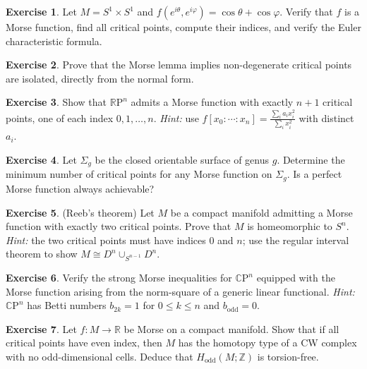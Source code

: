 \documentclass[12pt,a4paper,openany]{book}
\theoremstyle{definition}
\newtheorem{exercise}{Exercise}[chapter]
\theoremstyle{remark}
\newcommand{\Z}{\mathbb{Z}}
\newcommand{\R}{\mathbb{R}}
\newcommand{\RP}{\mathbb{R}\mathrm{P}}
\newcommand{\CP}{\mathbb{C}\mathrm{P}}
\begin{document}
\begin{exercise}\label{exo:morse-3}
Let $M = S^1 \times S^1$ and $f(e^{i\theta},e^{i\varphi}) = \cos\theta + \cos\varphi$.
Verify that $f$ is a Morse function, find all critical points, compute
their indices, and verify the Euler characteristic formula.
\end{exercise}

\begin{exercise}\label{exo:morse-4}
Prove that the Morse lemma implies non-degenerate critical points are
isolated, directly from the normal form.
\end{exercise}

\begin{exercise}\label{exo:morse-5}
Show that $\RP^n$ admits a Morse function with exactly $n+1$ critical
points, one of each index $0,1,\dots,n$.
\emph{Hint:} use $f[x_0:\cdots:x_n] = \frac{\sum_i a_i x_i^2}{\sum_i x_i^2}$
with distinct $a_i$.
\end{exercise}

\begin{exercise}\label{exo:morse-6}
Let $\Sigma_g$ be the closed orientable surface of genus $g$.
Determine the minimum number of critical points for any Morse function
on $\Sigma_g$. Is a perfect Morse function always achievable?
\end{exercise}

\begin{exercise}\label{exo:morse-7}
(Reeb's theorem) Let $M$ be a compact manifold admitting a Morse function
with exactly two critical points. Prove that $M$ is homeomorphic to $S^n$.
\emph{Hint:} the two critical points must have indices $0$ and $n$; use the
regular interval theorem to show $M \cong D^n \cup_{S^{n-1}} D^n$.
\end{exercise}

\begin{exercise}\label{exo:morse-8}
Verify the strong Morse inequalities for $\CP^n$ equipped with the Morse
function arising from the norm-square of a generic linear functional.
\emph{Hint:} $\CP^n$ has Betti numbers $b_{2k}=1$ for $0 \le k \le n$
and $b_{\text{odd}}=0$.
\end{exercise}

\begin{exercise}\label{exo:morse-9}
Let $f\colon M \to \R$ be Morse on a compact manifold. Show that if all
critical points have even index, then $M$ has the homotopy type of a CW
complex with no odd-dimensional cells. Deduce that $H_{\text{odd}}(M;\Z)$
is torsion-free.
\end{exercise}
\end{document}
